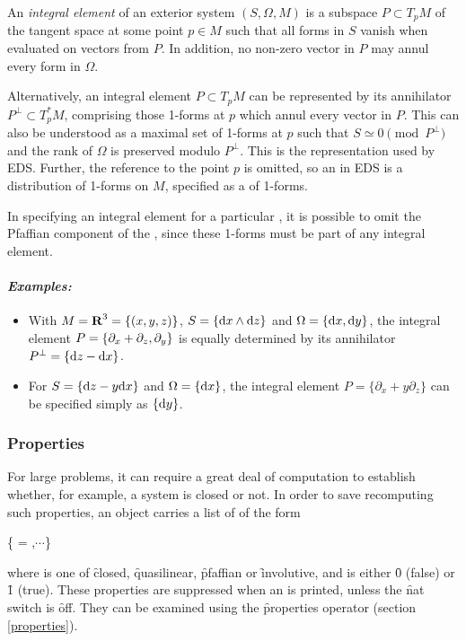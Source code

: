 An {\it integral element} of an exterior system $(S,\Omega,M)$ is a
subspace $P\subset T_pM$ of the tangent space at some point $p\in M$
such that all forms in $S$ vanish when evaluated on vectors from $P$. In
addition, no non-zero vector in $P$ may annul every form in $\Omega$. 

Alternatively, an integral element $P\subset T_pM$ can be represented
by its annihilator $P^\perp\subset T^*_pM$, comprising those 1-forms
at $p$ which annul every vector in $P$. This can also be understood as a
maximal set of 1-forms at $p$ such that $S \simeq 0 \pmod{P^\perp}$ and
the rank of $\Omega$ is preserved modulo $P^\perp$.  This is the
representation used by EDS. Further, the reference to the point $p$ is
omitted, so an  in EDS is a distribution of
1-forms on $M$, specified as a  of 1-forms. 

In specifying an integral element for a particular , it is
possible to omit the Pfaffian component of the , since these
1-forms must be part of any integral element.

\paragraph{\it Examples:}
\begin{itemize}
\item With $M = \hbox{\bf R}^3 = \{(x,y,z)\}$, $S = \{\mathrm{d} x\wedge \mathrm{d} z\}$ and
      $\Omega = \{\mathrm{d} x,\mathrm{d} y\}$, the integral element $P = \{\partial\sb
      x + \partial_z,\partial_y\}$ is equally determined by its
      annihilator $P^\perp = \{\mathrm{d} z - \mathrm{d} x\}$. 
\item For $S = \{\mathrm{d} z - y\mathrm{d} x\}$ and $\Omega = \{\mathrm{d} x\}$, the integral
      element $P = \{\partial_x + y\partial_z\}$ can be specified
      simply as $\{\mathrm{d} y\}$.
\end{itemize}

\subsubsection{Properties}
\label{Properties}

For large problems, it can require a great deal of computation to establish
whether, for example, a system is closed or not. In order to save
recomputing such properties, an  object carries a list of
 of the form
\begin{edssyntax}
	\{ = ,$\cdots$\}
\end{edssyntax}
where  is one of \f{closed}, \f{quasilinear}, \f{pfaffian} or
\f{involutive}, and  is either \f{0} (false) or \f{1}
(true). These properties are suppressed when an  is printed,
unless the \f{nat} switch is \f{off}. They can be examined using the
\f{properties} operator (section \ref{properties}).


